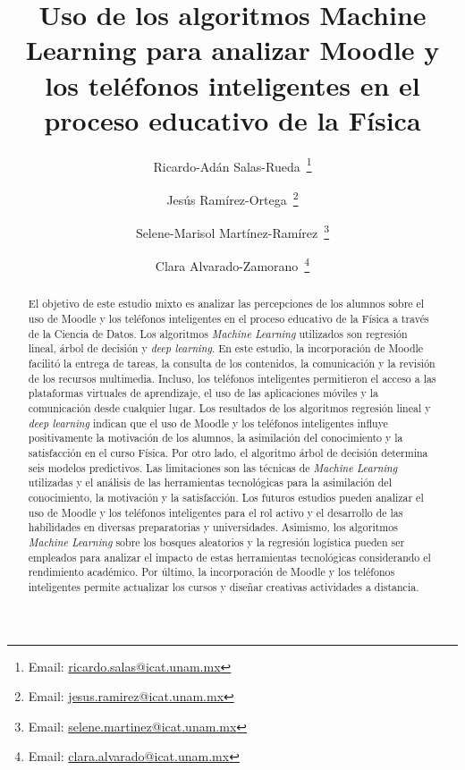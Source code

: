 \documentclass[spanish]{textolivre}
\title{Uso de los algoritmos Machine Learning para analizar Moodle y los teléfonos inteligentes en el proceso educativo de la Física}
\author[1]{Ricardo-Adán Salas-Rueda~\orcid{0000-0002-4188-4610}\thanks{Email: \href{mailto:ricardo.salas@icat.unam.mx}{ricardo.salas@icat.unam.mx}}}
\author[1]{Jesús Ramírez-Ortega~\orcid{0000-0002-4538-9203}\thanks{Email: \href{mailto:jesus.ramirez@icat.unam.mx}{jesus.ramirez@icat.unam.mx}}}
\author[1]{Selene-Marisol Martínez-Ramírez~\orcid{0000-0002-5655-0963}\thanks{Email: \href{mailto:selene.martinez@icat.unam.mx}{selene.martinez@icat.unam.mx}}}
\author[1]{Clara Alvarado-Zamorano~\orcid{0000-0001-9122-7590}\thanks{Email: \href{mailto:clara.alvarado@icat.unam.mx}{clara.alvarado@icat.unam.mx}}}
\affil[1]{Universidad Nacional Autónoma de México, Instituto de Ciencias Aplicadas y Tecnología, Ciudad de México, México.}
\begin{document}
\maketitle

\begin{polyabstract}
\begin{abstract}
El objetivo de este estudio mixto es analizar las percepciones de los alumnos sobre el uso de Moodle y los teléfonos inteligentes en el proceso educativo de la Física a través de la Ciencia de Datos. Los algoritmos \textit{Machine Learning} utilizados son regresión lineal, árbol de decisión y \textit{deep learning}. En este estudio, la incorporación de Moodle facilitó la entrega de tareas, la consulta de los contenidos, la comunicación y la revisión de los recursos multimedia. Incluso, los teléfonos inteligentes permitieron el acceso a las plataformas virtuales de aprendizaje, el uso de las aplicaciones móviles y la comunicación desde cualquier lugar. Los resultados de los algoritmos regresión lineal y \textit{deep learning} indican que el uso de Moodle y los teléfonos inteligentes influye positivamente la motivación de los alumnos, la asimilación del conocimiento y la satisfacción en el curso Física. Por otro lado, el algoritmo árbol de decisión determina seis modelos predictivos. Las limitaciones son las técnicas de \textit{Machine Learning} utilizadas y el análisis de las herramientas tecnológicas para la asimilación del conocimiento, la motivación y la satisfacción. Los futuros estudios pueden analizar el uso de Moodle y los teléfonos inteligentes para el rol activo y el desarrollo de las habilidades en diversas preparatorias y universidades. Asimismo, los algoritmos \textit{Machine Learning} sobre los bosques aleatorios y la regresión logística pueden ser empleados para analizar el impacto de estas herramientas tecnológicas considerando el rendimiento académico. Por último, la incorporación de Moodle y los teléfonos inteligentes permite actualizar los cursos y diseñar creativas actividades a distancia.

\end{abstract}


\end{polyabstract}
\end{document}
